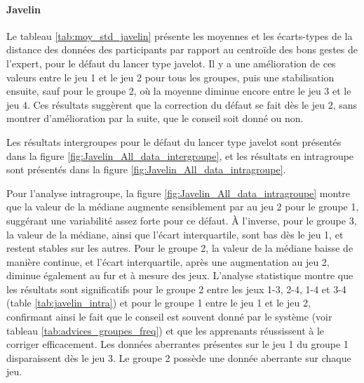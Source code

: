 \paragraph{Javelin}

Le tableau \ref{tab:moy_std_javelin} présente les moyennes et les écarts-types de la distance des données des participants par rapport au centroïde des bons gestes de l'expert, pour le défaut du lancer type javelot. Il y a une amélioration de ces valeurs entre le jeu 1 et le jeu 2 pour tous les groupes, puis une stabilisation ensuite, sauf pour le groupe 2, où la moyenne diminue encore entre le jeu 3 et le jeu 4. Ces résultats suggèrent que la correction du défaut se fait dès le jeu 2, sans montrer d'amélioration par la suite, que le conseil soit donné ou non.

\begin{table}[H]
\small
{}
\caption{Moyennes et écarts-types des données des apprenants (mouvement du coude).}
\label{tab:moy_std_javelin}
\end{table}

Les résultats intergroupes pour le défaut du lancer type javelot sont présentés dans la figure \ref{fig:Javelin_All_data_intergroupe}, et les résultats en intragroupe sont présentés dans la figure \ref{fig:Javelin_All_data_intragroupe}.

Pour l'analyse intragroupe, la figure \ref{fig:Javelin_All_data_intragroupe} montre que la valeur de la médiane augmente sensiblement par au jeu 2 pour le groupe 1, suggérant une variabilité assez forte pour ce défaut. À l'inverse, pour le groupe 3, la valeur de la médiane, ainsi que l'écart interquartile, sont bas dès le jeu 1, et restent stables sur les autres. Pour le groupe 2, la valeur de la médiane baisse de manière continue, et l'écart interquartile, après une augmentation au jeu 2, diminue également au fur et à mesure des jeux. L'analyse statistique montre que les résultats sont significatifs pour le groupe 2 entre les jeux 1-3, 2-4, 1-4 et 3-4 (table \ref{tab:javelin_intra}) et pour le groupe 1 entre le jeu 1 et le jeu 2, confirmant ainsi le fait que le conseil est souvent donné par le système (voir tableau \ref{tab:advices_groupes_freq}) et que les apprenants réussissent à le corriger efficacement. Les données aberrantes présentes sur le jeu 1 du groupe 1 disparaissent dès le jeu 3. Le groupe 2 possède une donnée aberrante sur chaque jeu.

